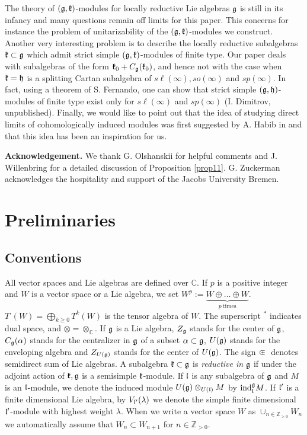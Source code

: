 \documentclass[12pt]{article}
\newcounter{theorem}
\newcommand {\ZZ} {\mathbb {Z}}
\newcommand {\CC} {\mathbb {C}}
\renewcommand{\ll}{\mathfrak{l}}
\newcommand{\refprop}[1]{Proposition \ref{#1}}
\def\cplus{\hbox{$\subset${\raise0.3ex\hbox{\kern -0.55em ${\scriptscriptstyle +}$}}\ }}
\begin{document}
The theory of $(\frak g, \frak k)$-modules for locally reductive Lie algebras $\frak g$ is still in its infancy and many questions remain off limits for this paper.  This concerns for instance the problem of unitarizability of the $(\frak g, \frak k)$-modules we construct.  Another very interesting problem is to describe the locally reductive subalgebras $\frak k\subset\frak g$ which admit strict simple $(\frak g, \frak k)$-modules of finite type.  Our paper deals with subalgebras of the form $\frak k_0 + C_{\frak g} (\frak k_0)$, and hence not with the case when $\frak k = \frak h$ is a splitting Cartan subalgebra of $s\ell (\infty), so(\infty)$ and $sp(\infty)$.  In fact, using a theorem of S. Fernando, one can show that strict simple $(\frak g,\frak h)$-modules of finite type exist only for $s\ell (\infty)$ and $sp(\infty)$ (I. Dimitrov, unpublished).  Finally, we would like to point out that the idea of studying direct limits of cohomologically induced modules was first suggested by A. Habib in \cite{Ha} and that this idea has been an inspiration for us.

{\bf Acknowledgement.}  We thank G. Olshanskii for helpful comments and J. Willenbring for a detailed discussion of \refprop{prop11}. G. Zuckerman acknowledges the hospitality and support of the Jacobs University Bremen.

\section{Preliminaries}\label{sec2}

\subsection{Conventions}  All vector spaces and Lie algebras are defined over $\CC$.  If $p$ is a positive integer and $W$ is a vector space or a Lie algebra, we set $W^p := \underbrace{W\oplus\ldots\oplus W}_{ p~{\text{times}}}$. $T^\cdot(W)=\bigoplus_{k\geq 0}T^k(W)$ is the tensor algebra of $W$. The superscript $^*$ indicates dual space, and $\otimes=\otimes_\CC$. If $\frak g$ is a Lie algebra, $Z_{\frak g}$ stands for the center of $\frak g$, $C_{\frak g} (\alpha)$ stands for the centralizer in $\frak g$ of a subset $\alpha\subset\frak g$, $U(\frak g)$ stands for the enveloping algebra and $Z_{U(\frak g)}$ stands for the center of $U(\frak g)$.  The sign $\cplus$ denotes semidirect sum of Lie algebras.  A subalgebra $\frak k\subset\frak g$ is {\it reductive in} $\frak g$ if under the adjoint action of $\frak k, \frak g$ is a semisimple $\frak k$-module.  If $\frak l$ is any subalgebra of $\frak g$ and $M$ is an $\frak l$-module, we denote the induced module $U(\frak g)\otimes_{U(\ll)} M$ by $\text{ind}^\frak g_\frak l M$.  If $\frak l'$ is a finite dimensional Lie algebra, by $V_{\frak l'}(\lambda)$ we denote the simple finite dimensional $\frak l'$-module with highest weight $\lambda$.  When we write a vector space $W$ as $\cup_{n\in\ZZ_{> 0}} W_n$ we automatically assume that $W_n\subset W_{n+1}$ for $n\in\ZZ_{> 0}$.
\end{document}
